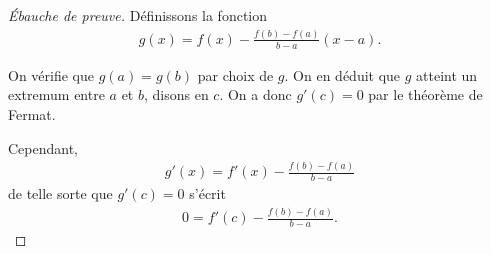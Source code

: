 \documentclass[main.tex]{subfiles}
\begin{document}
\begin{proof}[Ébauche de preuve]
    Définissons la fonction
    \begin{align}
        g(x) = f(x) - \frac {f(b) - f(a)} {b - a} (x - a).
    \end{align}

    On vérifie que $g(a) = g(b)$ par choix de $g$.
    On en déduit que $g$ atteint un extremum entre $a$ et $b$,
    disons en $c$.
    On a donc $g'(c) = 0$ par le théorème de Fermat.

    Cependant,
    \begin{align}
        g'(x) = f'(x) - \frac {f(b) - f(a)} {b - a}
    \end{align}
    de telle sorte que $g'(c) = 0$ s'écrit
    \begin{align}
        0 = f'(c) - \frac {f(b) - f(a)} {b - a}.
    \end{align}
\end{proof}
\end{document}
